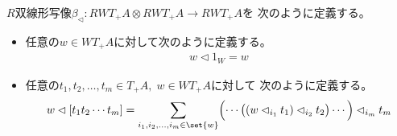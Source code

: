 		\begin{definition}[森による森への接木]\label{def:森による森への接木} %
			$R$双線形写像$\beta_\lhd: RWT_+A\otimes RWT_+A\to RWT_+A$を
			次のように定義する。
			\begin{itemize}\setlength{\itemsep}{-1mm} %
				\item 任意の$w\in WT_+A$に対して次のように定義する。
				\begin{equation*}\begin{split} %
					w\lhd 1_W = w
				\end{split}\end{equation*} %
				\item 任意の$t_1,t_2,\dots,t_m\in T_+A,\;w\in WT_+A$に対して
				次のように定義する。
				\begin{equation*}\begin{split} %
					w\lhd [t_1t_2\cdots t_m] 
					= \sum_{i_1,i_2,\dots,i_m\in \set{w}}\Bigl(
					\cdots\bigl((w\lhd_{i_1}t_1)\lhd_{i_2}t_2\bigr)\cdots
					\Bigr)\lhd_{i_m}t_m
				\end{split}\end{equation*} %
			\end{itemize} %
		\end{definition} %

